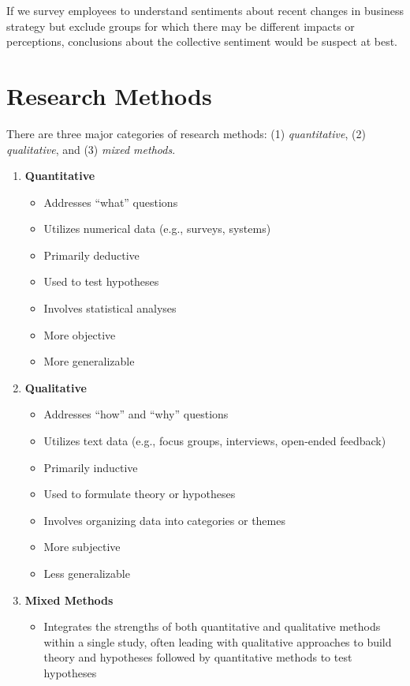 \documentclass[]{book}
\providecommand{\tightlist}{%
  \setlength{\itemsep}{0pt}\setlength{\parskip}{0pt}}
\begin{document}
If we survey employees to understand sentiments about recent changes in business strategy but exclude groups for which there may be different impacts or perceptions, conclusions about the collective sentiment would be suspect at best.

\hypertarget{research-methods}{%
\section{Research Methods}\label{research-methods}}

There are three major categories of research methods: (1) \emph{quantitative}, (2) \emph{qualitative}, and (3) \emph{mixed methods}.

\begin{enumerate}
\def\labelenumi{\arabic{enumi}.}
\tightlist
\item
  \textbf{Quantitative}

  \begin{itemize}
  \tightlist
  \item
    Addresses ``what'' questions
  \item
    Utilizes numerical data (e.g., surveys, systems)
  \item
    Primarily deductive
  \item
    Used to test hypotheses
  \item
    Involves statistical analyses
  \item
    More objective
  \item
    More generalizable
  \end{itemize}
\item
  \textbf{Qualitative}

  \begin{itemize}
  \tightlist
  \item
    Addresses ``how'' and ``why'' questions
  \item
    Utilizes text data (e.g., focus groups, interviews, open-ended feedback)
  \item
    Primarily inductive
  \item
    Used to formulate theory or hypotheses
  \item
    Involves organizing data into categories or themes
  \item
    More subjective
  \item
    Less generalizable
  \end{itemize}
\item
  \textbf{Mixed Methods}

  \begin{itemize}
  \tightlist
  \item
    Integrates the strengths of both quantitative and qualitative methods within a single study, often leading with qualitative approaches to build theory and hypotheses followed by quantitative methods to test hypotheses
  \end{itemize}
\end{enumerate}
\end{document}
